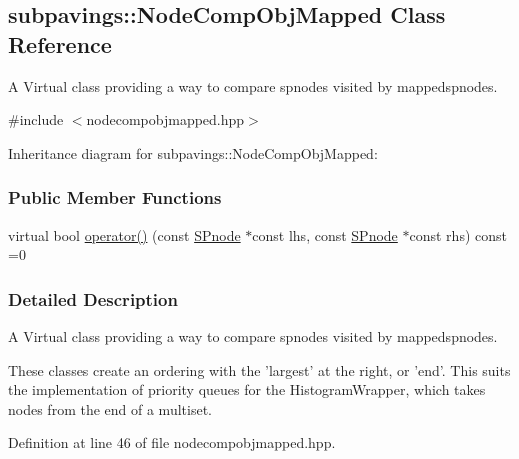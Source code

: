 \hypertarget{classsubpavings_1_1NodeCompObjMapped}{\subsection{subpavings\-:\-:\-Node\-Comp\-Obj\-Mapped \-Class \-Reference}
\label{classsubpavings_1_1NodeCompObjMapped}
}


\-A \-Virtual class providing a way to compare spnodes visited by mappedspnodes.  




{\ttfamily \#include $<$nodecompobjmapped.\-hpp$>$}



\-Inheritance diagram for subpavings\-:\-:\-Node\-Comp\-Obj\-Mapped\-:
\subsubsection*{\-Public \-Member \-Functions}
\begin{DoxyCompactItemize}
\item 
virtual bool \hyperlink{classsubpavings_1_1NodeCompObjMapped_a4064af278e741d1b248ae961329f537c}{operator()} (const \hyperlink{classsubpavings_1_1SPnode}{\-S\-Pnode} $\ast$const lhs, const \hyperlink{classsubpavings_1_1SPnode}{\-S\-Pnode} $\ast$const rhs) const =0
\end{DoxyCompactItemize}


\subsubsection{\-Detailed \-Description}
\-A \-Virtual class providing a way to compare spnodes visited by mappedspnodes. 

\-These classes create an ordering with the 'largest' at the right, or 'end'. \-This suits the implementation of priority queues for the \-Histogram\-Wrapper, which takes nodes from the end of a multiset. 

\-Definition at line 46 of file nodecompobjmapped.\-hpp.



